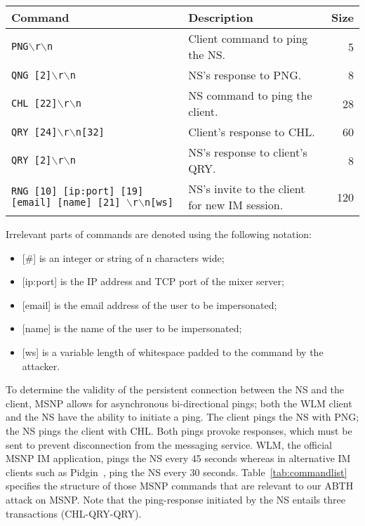 \documentclass{sig-alternate}
\begin{document}
\begin{table*}[tbp]
	\centering

	\caption {MSNP Commands}
	\label{tab:commandlist}

	\begin{tabular}{llr}
		\hline
		\hline
		\textbf{Command} & \textbf{Description} & \textbf{Size} \\
		\hline
		\texttt{PNG$\backslash$r$\backslash$n} & Client command to ping the NS.
& 5 \\
		\texttt{QNG [2]$\backslash$r$\backslash$n} & NS's response to PNG.
& 8 \\
		\texttt{CHL [22]$\backslash$r$\backslash$n} & NS command to ping the client.
& 28 \\
		\texttt{QRY [24]$\backslash$r$\backslash$n[32]} & Client's response to CHL.
& 60 \\
		\texttt{QRY [2]$\backslash$r$\backslash$n} & NS's response to client's QRY.
& 8 \\
		\texttt{RNG [10] [ip:port] [19] [email] [name] [21] $\backslash$r$\backslash$n[ws]} & NS's invite to the client for new IM session.
& 120 \\
		\hline
	\end{tabular}

	\begin{flushleft}
	Irrelevant parts of commands are denoted using the following notation:
	\begin{itemize}
		\item {[\#]} is an integer or string of n characters wide;
		\item {[ip:port]} is the IP address and TCP port of the mixer server;
		\item {[email]} is the email address of the user to be impersonated;
		\item {[name]} is the name of the user to be impersonated;
		\item {[ws]} is a variable length of whitespace padded to the command by the attacker.
	\end{itemize}
	\end{flushleft}

\end{table*}

To determine the validity of the persistent connection between the NS and the client, MSNP allows for asynchronous bi-directional pings; both the WLM client and the NS have the ability to initiate a ping.
The client pings the NS with PNG; the NS pings the client with CHL.
Both pings provoke responses, which must be sent to prevent disconnection from the messaging service.
WLM, the official MSNP IM application, pings the NS every 45 seconds whereas in alternative IM clients such as Pidgin~\cite{pidgin:url}, ping the NS every 30 seconds.
Table~\ref{tab:commandlist} specifies the structure of those MSNP commands that are relevant to our ABTH attack on MSNP.
Note that the ping-response initiated by the NS entails three transactions (CHL-QRY-QRY).
\end{document}
